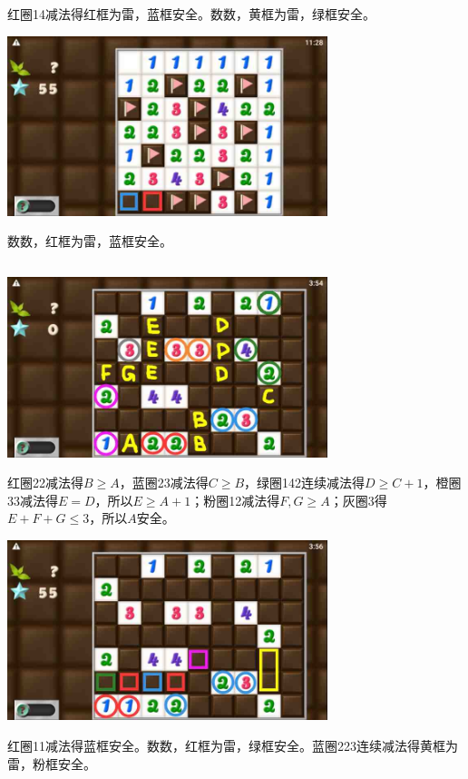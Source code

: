 红圈14减法得红框为雷，蓝框安全。数数，黄框为雷，绿框安全。
\begin{center}
    \includegraphics[width=0.7\textwidth]{puzzlelow/248-4.jpg}
\end{center}
数数，红框为雷，蓝框安全。

\subsection{} %
\begin{center}
    \includegraphics[width=0.7\textwidth]{puzzlelow/249-1.jpg}
\end{center}
红圈22减法得$B\ge A$，蓝圈23减法得$C\ge B$，绿圈142连续减法得$D\ge C+1$，橙圈33减法得$E=D$，所以$E\ge A+1$；粉圈12减法得$F,G\ge A$；灰圈3得$E+F+G\le 3$，所以$A$安全。
\begin{center}
    \includegraphics[width=0.7\textwidth]{puzzlelow/249-2.jpg}
\end{center}
红圈11减法得蓝框安全。数数，红框为雷，绿框安全。蓝圈223连续减法得黄框为雷，粉框安全。
